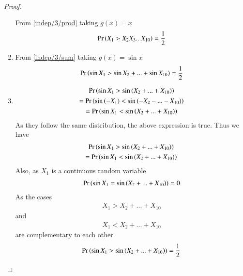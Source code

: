 \begin{proof}
\begin{enumerate}[label = (\Alph*)]
From \eqref{indep/3/prod} taking $g(x)=x$
        \begin{align}
         \Pr\left(X_1>X_2X_3...X_{10}\right)=\frac{1}{2}   
        \end{align}
\item 
From \eqref{indep/3/sum} taking $g(x)=\sin{x}$
        \begin{align}
         \Pr\left(\sin{X_1}>\sin{X_2}+...+\sin{X_{10}}\right)=\frac{1}{2}   
        \end{align}
\item \begin{multline}
        \Pr\left(\sin{X_1}>\sin{(X_2+...+X_{10})}\right)\\=\Pr\left(\sin{(-X_1)}<\sin{(-X_2-...-X_{10})}\right)\\
        =\Pr\left(\sin{X_1}<\sin{(X_2+...+X_{10})}\right)
    \end{multline}
    As they follow the same distribution, the above expression is true.
    Thus we have
    \begin{multline} 
    \Pr\left(\sin{X_1}>\sin{(X_2+...+X_{10}})\right)\\
        =\Pr\left(\sin{X_1}<\sin{(X_2+...+X_{10}})\right)    
    \end{multline}
    Also, as $X_1$ is a continuous random variable
    \begin{align}
       \Pr\left(\sin{X_1}=\sin{(X_2+...+X_{10})}\right)=0
    \end{align}
     As the cases
     \begin{align}
      {X_1>X_2+...+X_{10}}   
     \end{align}and 
     \begin{align}
         {X_1<X_2+...+X_{10}}
     \end{align}are complementary to each other 
        \begin{align}
         \Pr\left(\sin{X_1}>\sin{(X_2+...+X_{10}})\right)=\frac{1}{2}   
        \end{align}
\end{enumerate}
\end{proof}